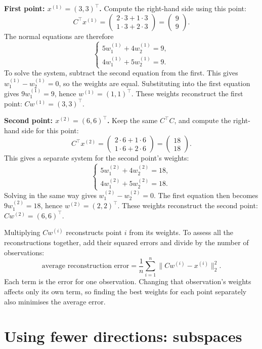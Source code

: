 \documentclass[a4paper,12pt,oneside]{report}
\begin{document}
\textbf{First point: $x^{(1)}=(3,3)^\top$.}
Compute the right-hand side using this point:
\[
  C^\top x^{(1)}
  =\begin{pmatrix}2\cdot3+1\cdot3\\1\cdot3+2\cdot3\end{pmatrix}
  =\begin{pmatrix}9\\9\end{pmatrix}.
\]
The normal equations are therefore
\[
  \begin{cases}
    5w_1^{(1)}+4w_2^{(1)}=9,\\
    4w_1^{(1)}+5w_2^{(1)}=9.
  \end{cases}
\]
To solve the system, subtract the second equation from the first.
This gives $w_1^{(1)}-w_2^{(1)}=0$, so the weights are equal.
Substituting into the first equation gives $9w_1^{(1)}=9$, hence
$w^{(1)}=(1,1)^\top$. These weights reconstruct the first point:
$Cw^{(1)}=(3,3)^\top$.

\textbf{Second point: $x^{(2)}=(6,6)^\top$.}
Keep the same $C^\top C$, and compute the right-hand side for this point:
\[
  C^\top x^{(2)}
  =\begin{pmatrix}2\cdot6+1\cdot6\\1\cdot6+2\cdot6\end{pmatrix}
  =\begin{pmatrix}18\\18\end{pmatrix}.
\]
This gives a separate system for the second point's weights:
\[
  \begin{cases}
    5w_1^{(2)}+4w_2^{(2)}=18,\\
    4w_1^{(2)}+5w_2^{(2)}=18.
  \end{cases}
\]
Solving in the same way gives $w_1^{(2)}-w_2^{(2)}=0$.
The first equation then becomes $9w_1^{(2)}=18$, hence
$w^{(2)}=(2,2)^\top$. These weights reconstruct the second point:
$Cw^{(2)}=(6,6)^\top$.

Multiplying $Cw^{(i)}$ reconstructs point $i$ from its weights. To
assess all the reconstructions together, add their squared errors
and divide by the number of observations:
\[
  \text{average reconstruction error}
  =\frac{1}{n}\sum_{i=1}^{n}
    \lVert Cw^{(i)}-x^{(i)}\rVert_2^2.
\]
Each term is the error for one observation. Changing that observation's
weights affects only its own term, so finding the best weights for
each point separately also minimises the average error.

\clearpage
\section{Using fewer directions: subspaces}
\end{document}
